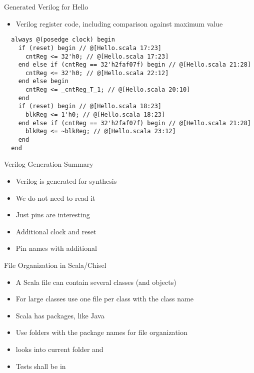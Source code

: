 \begin{frame}[fragile]{Generated Verilog for Hello}
\begin{itemize}
\item Verilog register code, including comparison against maximum value
\end{itemize}
\begin{verbatim}
  always @(posedge clock) begin
    if (reset) begin // @[Hello.scala 17:23]
      cntReg <= 32'h0; // @[Hello.scala 17:23]
    end else if (cntReg == 32'h2faf07f) begin // @[Hello.scala 21:28]
      cntReg <= 32'h0; // @[Hello.scala 22:12]
    end else begin
      cntReg <= _cntReg_T_1; // @[Hello.scala 20:10]
    end
    if (reset) begin // @[Hello.scala 18:23]
      blkReg <= 1'h0; // @[Hello.scala 18:23]
    end else if (cntReg == 32'h2faf07f) begin // @[Hello.scala 21:28]
      blkReg <= ~blkReg; // @[Hello.scala 23:12]
    end
  end
\end{verbatim}
\end{frame}

\begin{frame}[fragile]{Verilog Generation Summary}
\begin{itemize}
\item Verilog is generated for synthesis
\item We do not need to read it
\item Just pins are interesting
\item Additional clock and reset
\item Pin names with additional 
\end{itemize}
\end{frame}

\begin{frame}[fragile]{File Organization in Scala/Chisel}
\begin{itemize}
\item A Scala file can contain several classes (and objects)
\item For large classes use one file per class with the class name
\item Scala has packages, like Java
\item Use folders with the package names for file organization
\item {} looks into current folder and 
\item Tests shall be in 
\end{itemize}
\end{frame}

